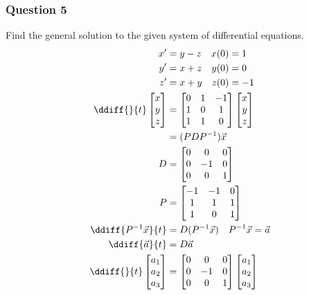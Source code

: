 \documentclass{math}
\begin{document}
\subsubsection*{Question 5}
Find the general solution to the given system of differential equations.
\begin{align*}
  x' &= y-z \quad x(0) = 1 \\
  y' &= x+z \quad y(0) = 0 \\
  z' &= x+y \quad z(0) = -1 \\
  \ddiff{}{t}\begin{bmatrix}x \\ y \\ z\end{bmatrix} &= \begin{bmatrix}
    0 & 1 & -1 \\
    1 & 0 & 1 \\
    1 & 1 & 0
  \end{bmatrix}\begin{bmatrix}x \\ y \\ z\end{bmatrix} \\
  &= (PDP^{-1})\vec{x} \\
  D &= \begin{bmatrix}
    0 & 0 & 0 \\
    0 & -1 & 0 \\
    0 & 0 & 1
  \end{bmatrix} \\
  P &= \begin{bmatrix}
    -1 & -1 & 0 \\
    1 & 1 & 1 \\
    1 & 0 & 1
  \end{bmatrix} \\
  \ddiff{P^{-1}\vec{x}}{t} &= D(P^{-1}\vec{x}) \quad P^{-1}\vec{x} = \vec{a} \\
  \ddiff{\vec{a}}{t} &= D\vec{a} \\
  \ddiff{}{t}\begin{bmatrix}a_1 \\ a_2 \\ a_3\end{bmatrix} &= \begin{bmatrix}
    0 & 0 & 0 \\
    0 & -1 & 0 \\
    0 & 0 & 1
  \end{bmatrix}\begin{bmatrix}a_1 \\ a_2 \\ a_3\end{bmatrix} \\

\end{align*}
\end{document}
